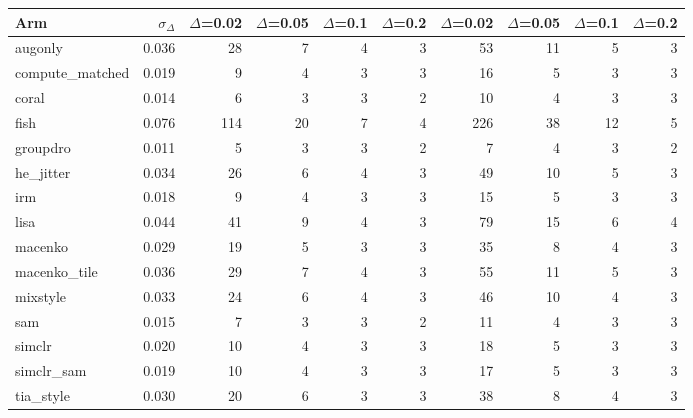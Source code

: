\begin{tabular}{lrrrrrrrrr}
\toprule
Arm & $\sigma_\Delta$ & $\Delta$=0.02 & $\Delta$=0.05 & $\Delta$=0.1 & $\Delta$=0.2 & $\Delta$=0.02 & $\Delta$=0.05 & $\Delta$=0.1 & $\Delta$=0.2 \\
\midrule
augonly & 0.036 & 28 & 7 & 4 & 3 & 53 & 11 & 5 & 3 \\
compute\_matched & 0.019 & 9 & 4 & 3 & 3 & 16 & 5 & 3 & 3 \\
coral & 0.014 & 6 & 3 & 3 & 2 & 10 & 4 & 3 & 3 \\
fish & 0.076 & 114 & 20 & 7 & 4 & 226 & 38 & 12 & 5 \\
groupdro & 0.011 & 5 & 3 & 3 & 2 & 7 & 4 & 3 & 2 \\
he\_jitter & 0.034 & 26 & 6 & 4 & 3 & 49 & 10 & 5 & 3 \\
irm & 0.018 & 9 & 4 & 3 & 3 & 15 & 5 & 3 & 3 \\
lisa & 0.044 & 41 & 9 & 4 & 3 & 79 & 15 & 6 & 4 \\
macenko & 0.029 & 19 & 5 & 3 & 3 & 35 & 8 & 4 & 3 \\
macenko\_tile & 0.036 & 29 & 7 & 4 & 3 & 55 & 11 & 5 & 3 \\
mixstyle & 0.033 & 24 & 6 & 4 & 3 & 46 & 10 & 4 & 3 \\
sam & 0.015 & 7 & 3 & 3 & 2 & 11 & 4 & 3 & 3 \\
simclr & 0.020 & 10 & 4 & 3 & 3 & 18 & 5 & 3 & 3 \\
simclr\_sam & 0.019 & 10 & 4 & 3 & 3 & 17 & 5 & 3 & 3 \\
tia\_style & 0.030 & 20 & 6 & 3 & 3 & 38 & 8 & 4 & 3 \\
\bottomrule
\end{tabular}
